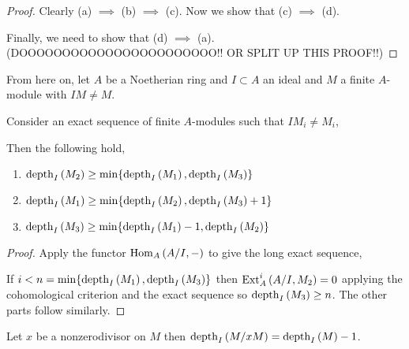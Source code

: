 \documentclass[12pt]{article}
\begin{document}
\begin{proof}
Clearly (a) $\implies$ (b) $\implies$ (c). Now we show that (c) $\implies$ (d).

Finally, we need to show that (d) $\implies$ (a).
(DOOOOOOOOOOOOOOOOOOOOOOO!! OR SPLIT UP THIS PROOF!!)
\end{proof}

\begin{rmk}
From here on, let $A$ be a Noetherian ring and $I \subset A$ an ideal and $M$ a finite $A$-module with $IM \neq M$.
\end{rmk}

\begin{lemma}
Consider an exact sequence of finite $A$-modules such that $I M_i \neq M_i$, 
\begin{center}
\end{center}
Then the following hold,
\begin{enumerate}
\item $\mathrm{depth}_{I} \left( M_2 \right) \ge \min \{ \mathrm{depth}_{I} \left( M_1 \right), \mathrm{depth}_{I} \left( M_3 \right) \}$

\item $\mathrm{depth}_{I} \left( M_1 \right) \ge \min \{ \mathrm{depth}_{I} \left( M_2 \right), \mathrm{depth}_{I} \left( M_3 \right) + 1 \}$

\item $\mathrm{depth}_{I} \left( M_3 \right) \ge \min \{ \mathrm{depth}_{I} \left( M_1 \right) - 1, \mathrm{depth}_{I} \left( M_2 \right) \}$
\end{enumerate}
\end{lemma}

\begin{proof}
Apply the functor $\mathrm{Hom}_{A} \left( A/I, - \right)$ to give the long exact sequence,
\begin{center}
\end{center}
If $i < n = \min \{ \mathrm{depth}_{I} \left( M_1 \right), \mathrm{depth}_{I} \left( M_3 \right) \}$ then $\mathrm{Ext}^{i}_{A} \left( A/I, M_2 \right) = 0$ applying the cohomological criterion and the exact sequence so $\mathrm{depth}_{I} \left( M_3 \right) \ge n$. The other parts follow similarly.
\end{proof}

\begin{lemma}
Let $x$ be a nonzerodivisor on $M$ then $\mathrm{depth}_{I} \left( M/xM \right) = \mathrm{depth}_{I} \left( M \right) - 1$.
\end{lemma}
\end{document}
